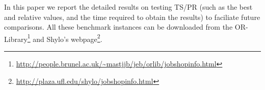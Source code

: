 \documentclass[authoryear,12pt]{elsarticle}
\begin{document}
\begin{table}[!h]
\begin{scriptsize}
\caption{The settings of some important parameters in TS/PR}
\label{Parameter_Settings}
\end{scriptsize}
\end{table}


\begin{table}[!h]\begin{scriptsize}
\caption{The settings of the time limit for different categories of instances}
\label{Time_limit}
\end{scriptsize}
\end{table}


In this paper we report the detailed results on testing TS/PR (such as the best and relative values, and the time required to obtain the results) to faciliate future comparisons. All these benchmark instances can be downloaded from the OR-Library\footnote{\url{http://people.brunel.ac.uk/~mastjjb/jeb/orlib/jobshopinfo.html}} and Shylo's webpage\footnote{\url{http://plaza.ufl.edu/shylo/jobshopinfo.html}}.
\end{document}
